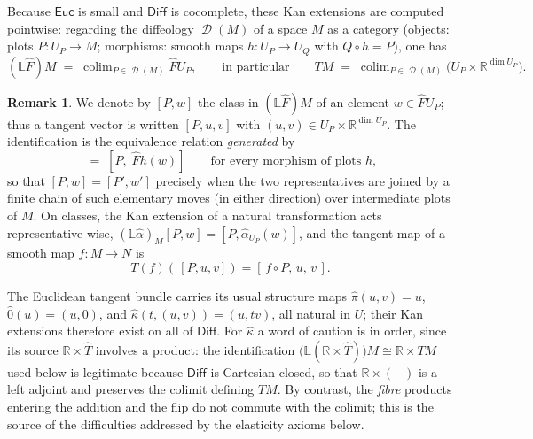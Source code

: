 \documentclass{amsart}
\newcommand{\R}{\mathbb{R}}
\DeclareMathOperator{\D}{\mathcal{D}}
\DeclareMathOperator{\colim}{colim}
\theoremstyle{definition}
\newtheorem{rem}[thm]{Remark}
\begin{document}
Because $\mathsf{Euc}$ is small and $\mathsf{Diff}$ is cocomplete, these Kan
extensions are computed pointwise: regarding the diffeology $\D(M)$ of a space
$M$ as a category (objects: plots $P\colon U_P \to M$; morphisms: smooth maps
$h\colon U_P \to U_Q$ with $Q \circ h = P$), one has
\begin{equation*}
  (\mathbb{L}\hat{F})M \;=\; \colim_{P \in \D(M)} \hat{F}U_P ,
  \qquad\text{in particular}\qquad
  TM \;=\; \colim_{P \in \D(M)} \bigl(U_P \times \R^{\dim U_P}\bigr).
\end{equation*}

\begin{rem}\label{rem:tangent-structure-2}
We denote by $[P, w]$ the class in $(\mathbb{L}\hat{F})M$ of an element
$w \in \hat{F}U_P$; thus a tangent vector is written $[P,u,v]$ with
$(u,v) \in U_P \times \R^{\dim U_P}$. The identification is the equivalence
relation \emph{generated} by
\begin{equation*}
  [P \circ h,\; w] \;=\; [P,\; \hat{F}h(w)]
  \qquad\text{for every morphism of plots } h ,
\end{equation*}
so that $[P,w] = [P',w']$ precisely when the two representatives are joined by
a finite chain of such elementary moves (in either direction) over
intermediate plots of $M$. On classes, the Kan extension of a natural
transformation acts representative-wise,
$(\mathbb{L}\hat{\alpha})_M[P,w] = [P, \hat{\alpha}_{U_P}(w)]$, and the tangent
map of a smooth map $f \colon M \to N$ is
\begin{equation*}
  T(f)(\,[P,u,v]) = [\,f \circ P,\, u,\, v\,].
\end{equation*}
\end{rem}

The Euclidean tangent bundle carries its usual structure maps
$\hat{\pi}(u,v) = u$, $\hat{0}(u) = (u,0)$, and
$\hat{\kappa}(t,(u,v)) = (u,tv)$, all natural in $U$; their Kan extensions
therefore exist on all of $\mathsf{Diff}$. For $\hat{\kappa}$ a word of caution
is in order, since its source $\R \times \hat{T}$ involves a product: the
identification $\bigl(\mathbb{L}(\R \times \hat{T})\bigr)M \cong \R \times TM$
used below is legitimate because $\mathsf{Diff}$ is Cartesian closed, so that
$\R \times (-)$ is a left adjoint and preserves the colimit defining $TM$. By
contrast, the \emph{fibre} products entering the addition and the flip do not
commute with the colimit; this is the source of the difficulties addressed by
the elasticity axioms below.
\end{document}
